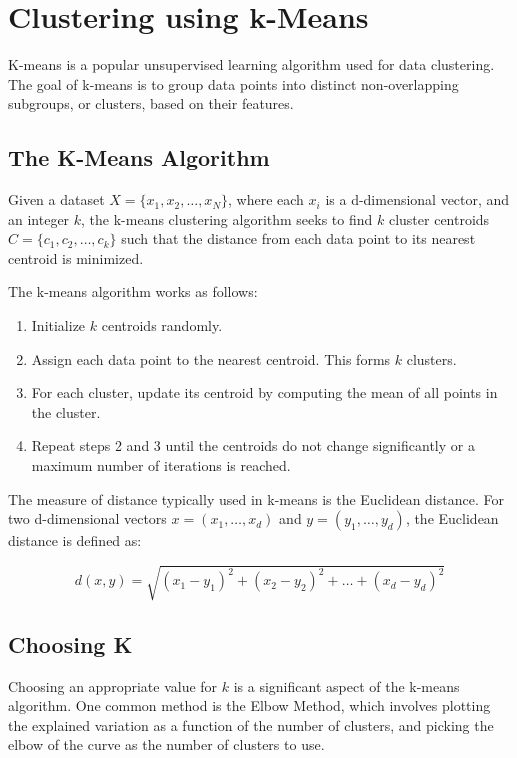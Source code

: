 \chapter{Clustering using k-Means}

K-means is a popular unsupervised learning algorithm used for data clustering. The goal of k-means is to group data points into distinct non-overlapping subgroups, or clusters, based on their features.

\section{The K-Means Algorithm}

Given a dataset $X = \{x_1, x_2, \ldots, x_N\}$, where each $x_i$ is a d-dimensional vector, and an integer $k$, the k-means clustering algorithm seeks to find $k$ cluster centroids $C = \{c_1, c_2, \ldots, c_k\}$ such that the distance from each data point to its nearest centroid is minimized.

The k-means algorithm works as follows:

\begin{enumerate}
    \item Initialize $k$ centroids randomly.
    \item Assign each data point to the nearest centroid. This forms $k$ clusters.
    \item For each cluster, update its centroid by computing the mean of all points in the cluster.
    \item Repeat steps 2 and 3 until the centroids do not change significantly or a maximum number of iterations is reached.
\end{enumerate}

The measure of distance typically used in k-means is the Euclidean distance. For two d-dimensional vectors $x = (x_1, \ldots, x_d)$ and $y = (y_1, \ldots, y_d)$, the Euclidean distance is defined as:

\begin{equation}
d(x, y) = \sqrt{(x_1 - y_1)^2 + (x_2 - y_2)^2 + \ldots + (x_d - y_d)^2}
\end{equation}

\section{Choosing K}

Choosing an appropriate value for $k$ is a significant aspect of the k-means algorithm. One common method is the Elbow Method, which involves plotting the explained variation as a function of the number of clusters, and picking the elbow of the curve as the number of clusters to use.

